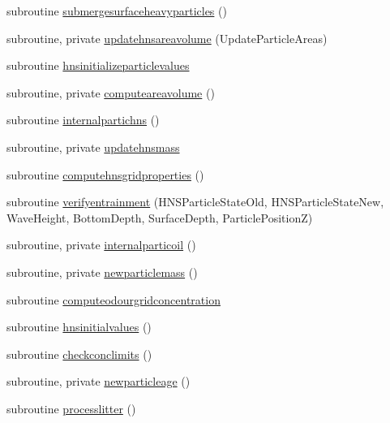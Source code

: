 \begin{DoxyCompactItemize}
\item 
subroutine \mbox{\hyperlink{namespacemodulelagrangianglobal_ac3b09a7520aad0e3fd4d4778451773cc}{submergesurfaceheavyparticles}} ()
\item 
subroutine, private \mbox{\hyperlink{namespacemodulelagrangianglobal_a4efc172cbdf3206e44a5ff0f788c26e1}{updatehnsareavolume}} (Update\+Particle\+Areas)
\item 
subroutine \mbox{\hyperlink{namespacemodulelagrangianglobal_a480cf2e664cf8fc186fb4ad80025693c}{hnsinitializeparticlevalues}}
\item 
subroutine, private \mbox{\hyperlink{namespacemodulelagrangianglobal_ad6190c60927cd9e871e45fcfd4fc5dd2}{computeareavolume}} ()
\item 
subroutine \mbox{\hyperlink{namespacemodulelagrangianglobal_a0d3f22e59bfbc417e9432a9f18a9027d}{internalpartichns}} ()
\item 
subroutine, private \mbox{\hyperlink{namespacemodulelagrangianglobal_a48c7d753da87150903bd31cb8ff38fb6}{updatehnsmass}}
\item 
subroutine \mbox{\hyperlink{namespacemodulelagrangianglobal_a9448f83b93f06396188a1d8aac9725f8}{computehnsgridproperties}} ()
\item 
subroutine \mbox{\hyperlink{namespacemodulelagrangianglobal_ad6565cf35585f706dfd2fa59deaed3b4}{verifyentrainment}} (H\+N\+S\+Particle\+State\+Old, H\+N\+S\+Particle\+State\+New, Wave\+Height, Bottom\+Depth, Surface\+Depth, Particle\+PositionZ)
\item 
subroutine, private \mbox{\hyperlink{namespacemodulelagrangianglobal_aaea914ea480f8d07a53b58420bf6b67e}{internalparticoil}} ()
\item 
subroutine, private \mbox{\hyperlink{namespacemodulelagrangianglobal_ab7a73b07470ae9858c75d8d622eabdff}{newparticlemass}} ()
\item 
subroutine \mbox{\hyperlink{namespacemodulelagrangianglobal_ac0a32c3b1f02a2a6ba502620bfc58fa6}{computeodourgridconcentration}}
\item 
subroutine \mbox{\hyperlink{namespacemodulelagrangianglobal_ad1111403d5d343cacd9cf3deb4c66ec9}{hnsinitialvalues}} ()
\item 
subroutine \mbox{\hyperlink{namespacemodulelagrangianglobal_a787d28742cbd84ad7a607a488de397e2}{checkconclimits}} ()
\item 
subroutine, private \mbox{\hyperlink{namespacemodulelagrangianglobal_aefd30b6e40fc0d2152594e910c0c05de}{newparticleage}} ()
\item 
subroutine \mbox{\hyperlink{namespacemodulelagrangianglobal_ae943a682fa588e08202185a107d59f97}{processlitter}} ()

\end{DoxyCompactItemize}
